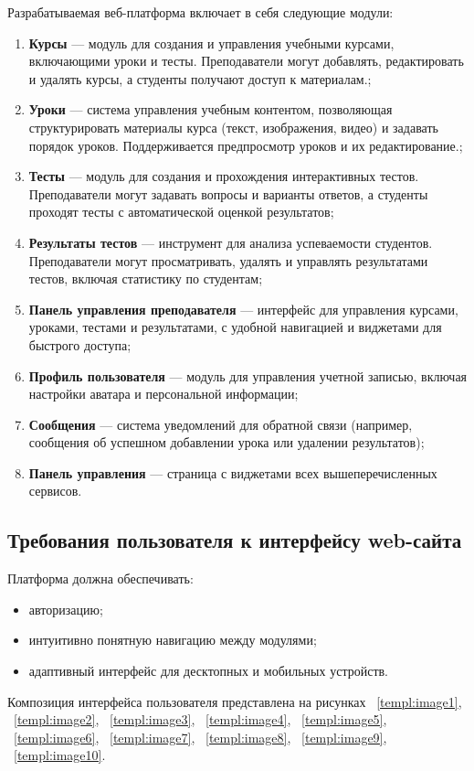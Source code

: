 Разрабатываемая веб-платформа включает в себя следующие модули:
\begin{enumerate}
\item \textbf{Курсы} — модуль для создания и управления учебными курсами, включающими уроки и тесты. Преподаватели могут добавлять, редактировать и удалять курсы, а студенты получают доступ к материалам.;
\item \textbf{Уроки} — система управления учебным контентом, позволяющая структурировать материалы курса (текст, изображения, видео) и задавать порядок уроков. Поддерживается предпросмотр уроков и их редактирование.;
\item \textbf{Тесты} — модуль для создания и прохождения интерактивных тестов. Преподаватели могут задавать вопросы и варианты ответов, а студенты проходят тесты с автоматической оценкой результатов;
\item \textbf{Результаты тестов} — инструмент для анализа успеваемости студентов. Преподаватели могут просматривать, удалять и управлять результатами тестов, включая статистику по студентам;
\item \textbf{Панель управления преподавателя} — интерфейс для управления курсами, уроками, тестами и результатами, с удобной навигацией и виджетами для быстрого доступа;
\item \textbf{Профиль пользователя} — модуль для управления учетной записью, включая настройки аватара и персональной информации;
\item \textbf{Сообщения} — система уведомлений для обратной связи (например, сообщения об успешном добавлении урока или удалении результатов);
\item \textbf{Панель управления} — страница с виджетами всех вышеперечисленных сервисов.
\end{enumerate}

\subsection{Требования пользователя к интерфейсу web-сайта}

Платформа должна обеспечивать:
\begin{itemize}
    \item авторизацию;
    \item интуитивно понятную навигацию между модулями;
    \item адаптивный интерфейс для десктопных и мобильных устройств.
\end{itemize}

Композиция интерфейса пользователя представлена на рисунках ~\ref{templ:image1}, ~\ref{templ:image2}, ~\ref{templ:image3}, ~\ref{templ:image4}, ~\ref{templ:image5}, ~\ref{templ:image6}, ~\ref{templ:image7}, ~\ref{templ:image8}, ~\ref{templ:image9},  ~\ref{templ:image10}.
\newpage  

